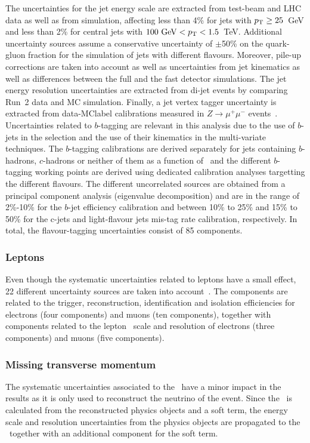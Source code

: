 The uncertainties for the jet energy scale are extracted from test-beam and LHC data as well as from simulation, affecting less than 4\% for jets with $p_{\text{T}}\geq25$~GeV and less than 2\% for central jets with $100\text{ GeV}<p_{\text{T}}<1.5$~TeV. Additional uncertainty sources assume a conservative uncertainty of $\pm$50\% on the quark-gluon fraction for the simulation of jets with different flavours. Moreover, pile-up corrections are taken into account as well as uncertainties from jet kinematics as well as differences between the full and the fast detector simulations. The jet energy resolution uncertainties are extracted from di-jet events by comparing Run~2 data and MC simulation. Finally, a jet vertex tagger uncertainty is extracted from data-\acrshort{MClabel} calibrations measured in $Z\to\mu^+\mu^-$ events~\cite{Bothmann2016}.\\

Uncertainties related to $b$-tagging are relevant in this analysis due to the use of $b$-jets in the selection and the use of their kinematics in the multi-variate techniques. The $b$-tagging calibrations are derived separately for jets containing $b$-hadrons, $c$-hadrons or neither of them as a function of \pT\ and the different $b$-tagging working points are derived using dedicated calibration analyses targetting the different flavours. The different uncorrelated sources are obtained from a principal component analysis (eigenvalue decomposition) and are in the range of 2\%-10\% for the $b$-jet efficiency calibration and between 10\% to 25\% and
15\% to 50\% for the c-jets and light-flavour jets mis-tag rate calibration, respectively. In total, the flavour-tagging uncertainties consist of 85 components.\\

\subsubsection{Leptons}
Even though the systematic uncertainties related to leptons have a small effect, 22 different uncertainty sources are taken into account~\cite{performanceEgamma,performancemu}. The components are related to the trigger, reconstruction, identification and isolation efficiencies for electrons (four components) and muons (ten components), together with components related to the lepton \pT\ scale and resolution of electrons (three components) and muons (five components).

\subsubsection{Missing transverse momentum}
The systematic uncertainties associated to the \MET\ have a minor impact in the results as it is only used to reconstruct the neutrino of the event. Since the \MET\ is calculated from the reconstructed physics objects and a soft term, the energy scale and resolution uncertainties from the physics objects are propagated to the \MET\ together with an additional component for the soft term. 

